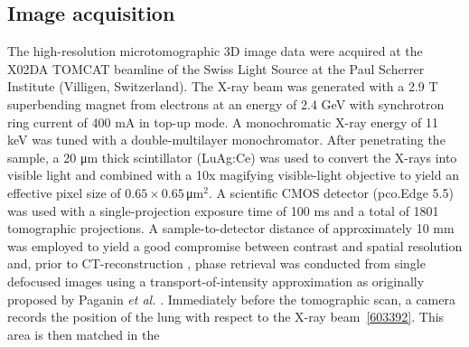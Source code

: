 \subsection{Image acquisition}\label{sec:acquisition}
The high-resolution microtomographic 3D image data were acquired at the X02DA TOMCAT beamline of the Swiss Light Source at the Paul Scherrer Institute (Villigen, Switzerland). The X-ray beam was generated with a 2.9 T superbending magnet from electrons at an energy of 2.4 GeV with synchrotron ring current of 400 mA in top-up mode. A monochromatic X-ray energy of 11 keV was tuned with a double-multilayer monochromator. After penetrating the sample, a 20 μm thick scintillator (LuAg:Ce) was used to convert the X-rays into visible light and combined with a 10x magifying visible-light objective to yield an effective pixel size of $0.65 \times 0.65\,$μm$^2$. A scientific CMOS detector (pco.Edge 5.5) was used with a single-projection exposure time of 100 ms and a total of 1801 tomographic projections. A sample-to-detector distance of approximately 10 mm was employed to yield a good compromise between contrast and spatial resolution and, prior to CT-reconstruction \cite{Marone2012}, phase retrieval was conducted from single defocused images using a transport-of-intensity approximation as originally proposed by Paganin \textit{et al.} \cite{Paganin2002}. Immediately before the tomographic scan, a camera records the position of the lung with respect to the X-ray beam~\ref{603392}. This area is then matched in the 

